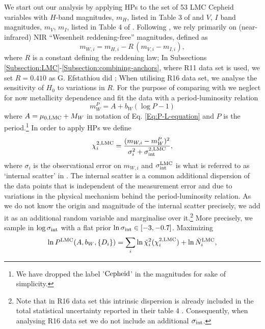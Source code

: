 We start out our analysis by applying HPs to the set of 
53 LMC Cepheid variables with $H$-band magnitudes, $m_H$, listed in Table 3 of  \cite{2004AJ:128.2239P} and $V$, $I$ band magnitudes, $m_V$, $m_I$, listed in Table 4 of \cite{2002ApJS:142:71S}. Following \cite{Riess:2016jrr}, we rely primarily on (near-infrared) NIR ``Wesenheit reddening-free'' magnitudes, defined as 
\begin{equation}\label{Eq:Wesenheit-reddening-free}
m_{W,i} = m_{H,i} - R\, (m_{V,i} - m_{I,i}),
\end{equation}
where $R$ is a constant defining the reddening law; In Subsections \ref{Subsection:LMC}-\ref{Subsection:combining-anchors}, where R11 data set is used, we set $R=0.410$ as G. Efstathiou did \cite{Efstathiou:2013via}; When utilising R16 data set, we analyse the sensitivity of $H_0$ to variations in $R$. For the purpose of comparing with \cite{Efstathiou:2013via} we neglect for now metallicity dependence and fit the data with a period-luminosity relation
\begin{equation}\label{Eq:P-L-LMC}
m^P_W = A + b_W (\log P - 1)
\end{equation}
where $A = \mu_{0,\mathrm{LMC}} + M_W$ in notation of Eq. \eqref{Eq:P-L-equation} and $P$ is the period.\footnote{We have dropped the label '$\mathrm{Cepheid}$' in the magnitudes for sake of simplicity.} In order to apply HPs we define 
\begin{equation}\label{Eq:chi2-LMC}
\chi^{2,\mathrm{LMC}}_{i} = \frac{(m_{W,i} - m^P_{W})^2}{\sigma_i^2 + \sigma^{2,\mathrm{LMC}}_{\mathrm{int}}},
\end{equation}
where $\sigma_i$ is the observational error on $m_{W,i}$ and $\sigma_{\mathrm{int}}^{\mathrm{LMC}}$ is what is referred to as `internal scatter' in \cite{Efstathiou:2013via}. The internal scatter is a common additional dispersion of the data points that is independent of the measurement error and due to variations in the physical mechanism behind the period-luminosity relation. As we do not know the origin and magnitude of the internal scatter precisely, we add it as an additional random variable and marginalise over it.\footnote{Note that in R16 data set this intrinsic dispersion is already included in the total statistical uncertainty reported in their table 4 \cite{Riess:2016jrr}. Consequently, when analysing R16 data set we do not include an additional $\sigma_{\mathrm{int}}$.} More precisely, we sample in $\log \sigma_{\mathrm{int}}$ with a flat prior $\ln \sigma_{\mathrm{int}} \in [-3,-0.7]$.
Maximizing  
\begin{equation}
\label{Eq:likelihood-HP-LMC}
\ln P^{\mathrm{LMC}}(A,b_W,\lbrace D_i \rbrace) = \sum_{i} \ln \tilde{\chi}_i^{2}(\chi^{2,\mathrm{LMC}}_{i}) + \ln \tilde{N}^{\mathrm{LMC}}_{i},
\end{equation}
